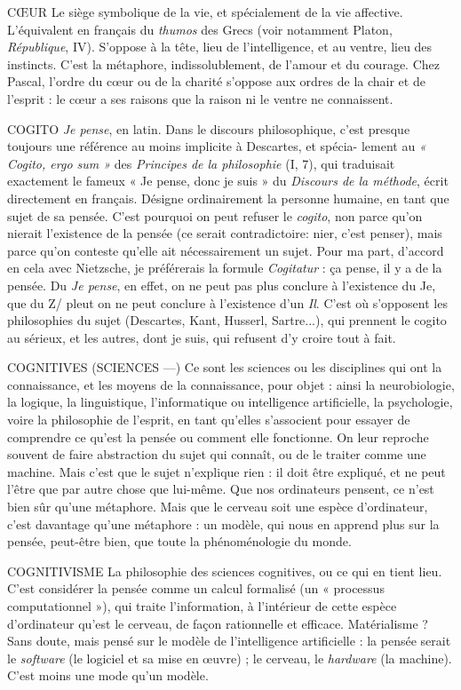 CŒUR Le siège symbolique de la vie, et spécialement de la vie affective.
L’équivalent en français du {\it thumos} des Grecs (voir notamment
Platon, {\it République}, IV). S’oppose à la tête, lieu de l’intelligence, et au ventre,
lieu des instincts. C’est la métaphore, indissolublement, de l’amour et du courage.
Chez Pascal, l’ordre du cœur ou de la charité s'oppose aux ordres de la chair
et de l'esprit : le cœur a ses raisons que la raison ni le ventre ne connaissent.

COGITO {\it Je pense}, en latin. Dans le discours philosophique, c’est presque
toujours une référence au moins implicite à Descartes, et spécia-
lement au {\it « Cogito, ergo sum »} des {\it Principes de la philosophie} (I, 7), qui traduisait
exactement le fameux « Je pense, donc je suis » du {\it Discours de la méthode},
écrit directement en français. Désigne ordinairement la personne humaine, en
tant que sujet de sa pensée. C’est pourquoi on peut refuser le {\it cogito}, non parce
qu’on nierait l’existence de la pensée (ce serait contradictoire: nier, c’est
penser), mais parce qu’on conteste qu’elle ait nécessairement un sujet. Pour ma
part, d’accord en cela avec Nietzsche, je préférerais la formule {\it Cogitatur} : ça
pense, il y a de la pensée. Du {\it Je pense}, en effet, on ne peut pas plus conclure à
l'existence du Je, que du Z/ pleut on ne peut conclure à l’existence d’un {\it Il}. C’est
où s'opposent les philosophies du sujet (Descartes, Kant, Husserl, Sartre...),
qui prennent le cogito au sérieux, et les autres, dont je suis, qui refusent d’y
croire tout à fait.

COGNITIVES (SCIENCES —) Ce sont les sciences ou les disciplines qui
ont la connaissance, et les moyens de la
connaissance, pour objet : ainsi la neurobiologie, la logique, la linguistique,
l'informatique ou intelligence artificielle, la psychologie, voire la philosophie de
l'esprit, en tant qu’elles s'associent pour essayer de comprendre ce qu'est la
pensée ou comment elle fonctionne. On leur reproche souvent de faire abstraction
du sujet qui connaît, ou de le traiter comme une machine. Mais c’est que
le sujet n’explique rien : il doit être expliqué, et ne peut l’être que par autre
chose que lui-même. Que nos ordinateurs pensent, ce n’est bien sûr qu’une
métaphore. Mais que le cerveau soit une espèce d’ordinateur, c’est davantage
qu’une métaphore : un modèle, qui nous en apprend plus sur la pensée, peut-être
bien, que toute la phénoménologie du monde.

COGNITIVISME La philosophie des sciences cognitives, ou ce qui en tient
lieu. C’est considérer la pensée comme un calcul formalisé
(un « processus computationnel »), qui traite l’information, à l’intérieur de
cette espèce d'ordinateur qu'est le cerveau, de façon rationnelle et efficace.
Matérialisme ? Sans doute, mais pensé sur le modèle de l'intelligence
artificielle : la pensée serait le {\it software} (le logiciel et sa mise en œuvre) ; le cerveau,
le {\it hardware} (la machine). C’est moins une mode qu’un modèle.

